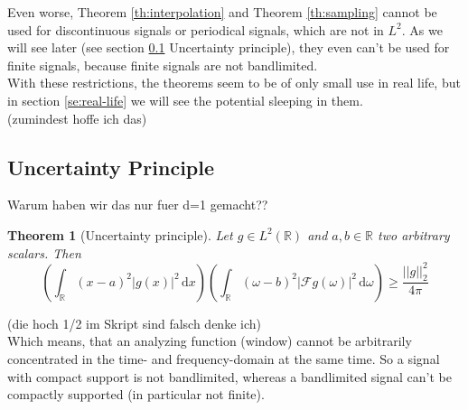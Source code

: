 \documentclass[a4paper, 11pt]{scrreprt}
\newtheorem{theorem}[defi]{Theorem}
\newcommand{\RR}{\mathbb{R}}
\newcommand{\FF}{\mathcal{F}}
\begin{document}
Even worse, Theorem  \ref{th:interpolation} and Theorem \ref{th:sampling} cannot be used for discontinuous signals or periodical signals, which are not in \(L^2\). As we will see later (see section \ref{se:uncertainty} Uncertainty principle), they even can't be used for finite signals, because finite signals are not bandlimited. \\
With these restrictions, the theorems seem to be of only small use in real life, but in section \ref{se:real-life} we will see the potential sleeping in them.\\
(zumindest hoffe ich das)


\subsection{Uncertainty Principle}
\label{se:uncertainty}
Warum haben wir das nur fuer d=1 gemacht??
\begin{theorem}[Uncertainty principle]
Let \(g\in L^2(\RR) \) and \(a,b \in\RR\) two arbitrary scalars. Then
\begin{equation}
\label{eq:uncertainty}
\left(\int_{\RR} (x-a)^2|g(x)|^2 \,\mathrm{d}x\right)\left(\int_{\RR}(\omega-b)^2|\FF g(\omega)|^2\,\mathrm{d}\omega\right) \geq \frac{||g||_2^2}{4\pi}
\end{equation}
\end{theorem}
(die hoch 1/2 im Skript sind falsch denke ich)\\
Which means, that an analyzing function (window) cannot be arbitrarily concentrated in the time- and frequency-domain at the same time. So a signal with compact support is not bandlimited, whereas a bandlimited signal can't be compactly supported (in particular not finite).\\
\end{document}
